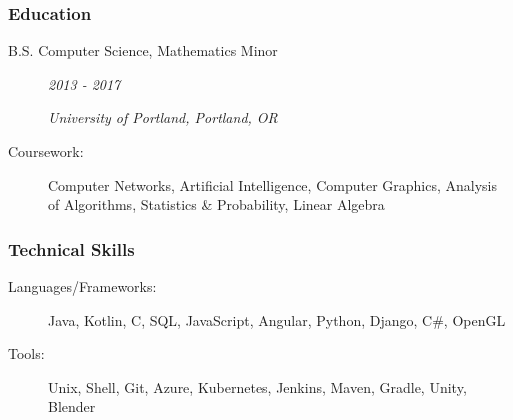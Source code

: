 \documentclass{article}
\begin{document}
\subsubsection*{Education}
    \begin{description}
        \item[B.S. Computer Science, Mathematics Minor]\hfill \textit{2013 - 2017}

        \textit{University of Portland, Portland, OR}

        \vspace{0.5em}

        \item[Coursework:]
            Computer Networks, 
            Artificial Intelligence, 
            Computer Graphics, 
            Analysis of Algorithms,
            Statistics \& Probability,
            Linear Algebra
    \end{description}


\subsubsection*{Technical Skills}
    \begin{description}    
        \item[Languages/Frameworks:] 
            Java, 
            Kotlin,
            C, 
            SQL,
            JavaScript,
            Angular,
            Python,
            Django, 
            C\#,
            OpenGL

            \vspace{0.5em}

        \item[Tools:] 
            Unix,
            Shell,
            Git,
            Azure,
            Kubernetes,
            Jenkins,
            Maven,
            Gradle,
            Unity,
            Blender
    \end{description}
\end{document}
